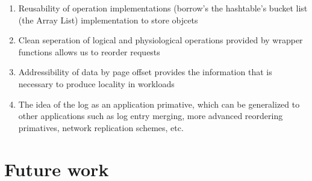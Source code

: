 \documentclass[letterpaper,twocolumn,english]{article}
\begin{document}
\begin{enumerate}
\item{Reusability of operation implementations (borrow's the hashtable's bucket list (the Array List) implementation to store objcets}
\item{Clean seperation of logical and physiological operations provided by wrapper functions allows us to reorder requests}
\item{Addressibility of data by page offset provides the information that is necessary to produce locality in workloads}
\item{The idea of the log as an application primative, which can be generalized to other applications such as log entry merging, more advanced reordering primatives, network replication schemes, etc.} 
\end{enumerate}
%
%
%
%    
% 
%
%
%
%
%
%    
%
%

\section{Future work}
\end{document}
